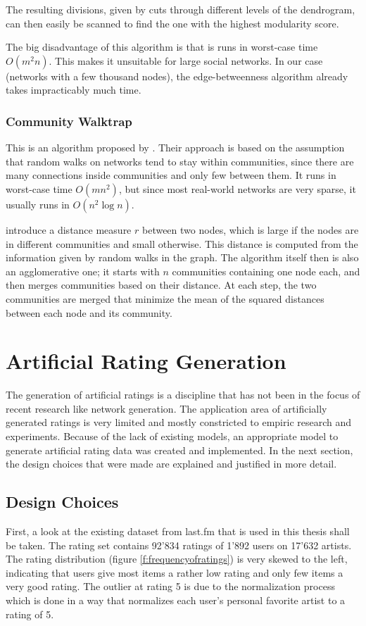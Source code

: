 The resulting divisions, given by cuts through different levels of the dendrogram, can then easily be scanned to find the one with the highest modularity score.

The big disadvantage of this algorithm is that is runs in worst-case time $O(m^2n)$. This makes it unsuitable for large social networks. In our case (networks with a few thousand nodes), the edge-betweenness algorithm already takes impracticably much time.

\subsubsection{Community Walktrap}
\label{ssst:communitywalktrap} This is an algorithm proposed by \cite{Pons_2005}. Their approach is based on the assumption that random walks on networks tend to stay within communities, since there are many connections inside communities and only few between them. It runs in worst-case time $O(m n^2)$, but since most real-world networks are very sparse, it usually runs in $O(n^2\log n)$.

\cite{Pons_2005} introduce a distance measure $r$ between two nodes, which is large if the nodes are in different communities and small otherwise. This distance is computed from the information given by random walks in the graph. The algorithm itself then is also an agglomerative one; it starts with $n$ communities containing one node each, and then merges communities based on their distance. At each step, the two communities are merged that minimize the mean of the squared distances between each node and its community.
\section{Artificial Rating Generation}
\label{st:artificialratinggeneration} The generation of artificial ratings is a discipline that has not been in the focus of recent research like network generation. The application area of artificially generated ratings is very limited and mostly constricted to empiric research and experiments. Because of the lack of existing models, an appropriate model to generate artificial rating data was created and implemented. In the next section, the design choices that were made are explained and justified in more detail.

\subsection{Design Choices}
\label{sst:designchoices} First, a look at the existing dataset from last.fm that is used in this thesis shall be taken. The rating set contains 92'834 ratings of 1'892 users on 17'632 artists. The rating distribution (figure \ref{f:frequencyofratings}) is very skewed to the left, indicating that users give most items a rather low rating and only few items a very good rating. The outlier at rating 5 is due to the normalization process which is done in a way that normalizes each user's personal favorite artist to a rating of 5.

